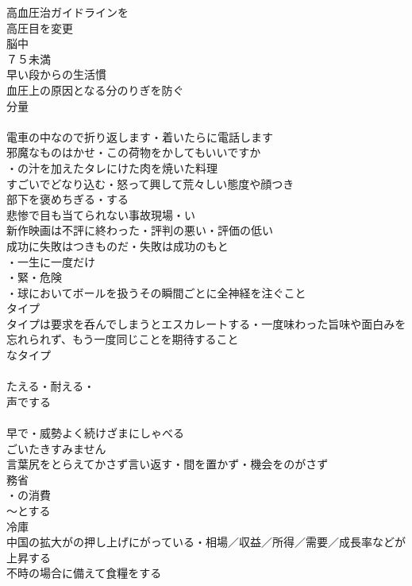 高血圧治ガイドラインを\\
高圧目を変更\\
脳中\\
７５未満\\
早い段からの生活慣\\
血圧上の原因となる分のりぎを防ぐ\\
分量\\
\\

電車の中なので折り返します・着いたらに電話します\\
邪魔なものはかせ・この荷物をかしてもいいですか\\
・の汁を加えたタレにけた肉を焼いた料理\\
すごいでどなり込む・怒って興して荒々しい態度や顔つき\\
部下を褒めちぎる・する\\
悲惨で目も当てられない事故現場・い\\
新作映画は不評に終わった・評判の悪い・評価の低い\\
成功に失敗はつきものだ・失敗は成功のもと\\
・一生に一度だけ\\
・緊・危険\\
・球においてボールを扱うその瞬間ごとに全神経を注ぐこと\\

タイプ\\
タイプは要求を呑んでしまうとエスカレートする・一度味わった旨味や面白みを忘れられず、もう一度同じことを期待すること\\
なタイプ\\
\\
たえる・耐える・\\
声でする\\
\\
早で・威勢よく続けざまにしゃべる\\
ごいたきすみません\\
言葉尻をとらえてかさず言い返す・間を置かず・機会をのがさず\\

務省\\
・の消費\\
〜とする\\
冷庫\\
中国の拡大がの押し上げにがっている・相場／収益／所得／需要／成長率などが上昇する\\
不時の場合に備えて食糧をする\\

